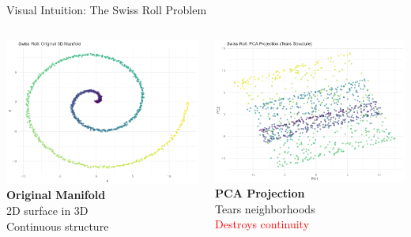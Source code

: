 \documentclass[aspectratio=169]{beamer}
\begin{document}
\begin{frame}{Visual Intuition: The Swiss Roll Problem}
\begin{columns}
\includegraphics[width=\textwidth]{./Figures/swiss_roll_3d.png}
\textbf{Original Manifold}\\
2D surface in 3D\\
Continuous structure

\includegraphics[width=\textwidth]{./Figures/swiss_roll_pca.png}
\textbf{PCA Projection}\\
Tears neighborhoods\\
\textcolor{red}{Destroys continuity}


\end{columns}
\end{frame}
\end{document}

